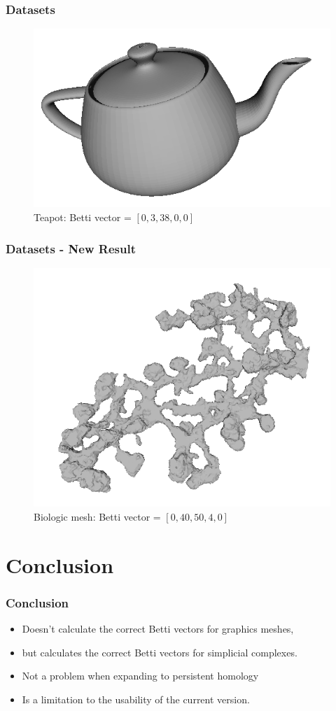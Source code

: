 \documentclass{beamer}
\begin{document}
\begin{frame}
\frametitle{Datasets}
\begin{figure}
\center
\includegraphics[scale=0.5]{teapot00.png}
\caption{Teapot: Betti vector = $[0,3,38,0,0]$}
\end{figure}
\end{frame}

\begin{frame}
\frametitle{Datasets - New Result}
\begin{figure}
\center
\includegraphics[scale=0.5]{testmesh00.png}
\caption{Biologic mesh: Betti vector = $[0,40,50,4,0]$}
\end{figure}
\end{frame}

\section{Conclusion}
\begin{frame}
\frametitle{Conclusion}
\begin{itemize}
\item Doesn't calculate the correct Betti vectors for graphics meshes,
\item but calculates the correct Betti vectors for simplicial complexes.
\item Not a problem when expanding to persistent homology
\item Is a limitation to the usability of the current version.
\end{itemize}
\end{frame}
\end{document}
